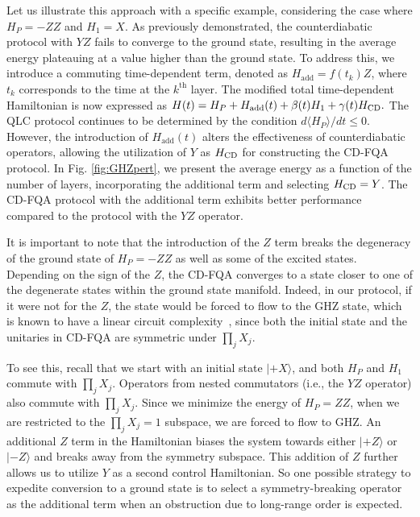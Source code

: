 \documentclass[twocolumn,aps,superscriptaddress,floatfix,longbibliography]{revtex4-2}
\newcommand{\la}{\langle}
\newcommand{\ra}{\rangle}
\def\YZ{\ensuremath{\mathit{YZ}}\xspace}
\def\ZZ{\ensuremath{\mathit{ZZ}}\xspace}
\begin{document}
Let us illustrate this approach with a specific example,
considering the case where $H_P=-\ZZ$ and $H_1=X$. As previously
demonstrated, the counterdiabatic protocol with \YZ fails to
converge to the ground state, resulting in the average energy
plateauing at a value higher than the ground state. To address
this, 
we introduce a commuting time-dependent term,
denoted as $H_{\text{add}}=f(t_{k})Z$, where $t_k$ corresponds
to the time at the $k^{\text{th}}$ layer. The modified total
time-dependent Hamiltonian is now expressed as
$H(t)=H_{P}+H_{\text{add}}(t)+\beta(t)H_1+\gamma(t)H_{\rm CD}.$
The QLC protocol continues to be determined by the condition
$d\la H_P \ra/dt \leq 0$. However, the introduction of
$H_{\text{add}}(t)$ alters the effectiveness of counterdiabatic
operators, allowing the utilization of $Y$ as $H_{\rm CD}$ for
constructing the CD-FQA protocol. In Fig. \ref{fig:GHZpert}, we
present the average energy as a function of the number of
layers, incorporating the additional term and selecting
$H_{\rm CD}=Y$. The CD-FQA protocol with the additional term
exhibits better performance compared to the protocol with the
\YZ operator.

It is important to note that the introduction of the $Z$ term
breaks the degeneracy of the ground state of $H_{P}=-\ZZ$ as well as some of the excited states. 
Depending on the sign of the $Z$, the CD-FQA converges
to a state closer to one of the degenerate states within the
ground state manifold. Indeed, in our protocol, if it were not for the
$Z$, the state would be forced to flow to the GHZ
state, which is known to have a linear circuit
complexity~\cite{bravyi2006lieb, yu2023learning}, since both the initial state and the unitaries in CD-FQA are symmetric under $\prod_j X_j$.  

To see this, recall that we start with an initial state  $|{+}X\rangle$, and both $H_P$ and $H_1$ commute with $\prod_j X_j$. Operators from nested commutators (i.e., the \YZ operator) also commute with $\prod_j X_j$. Since we minimize the energy of $H_P=\ZZ$, when we are restricted to the $\prod_j X_j=1$ subspace, we are forced to flow to GHZ. An additional $Z$ term in the Hamiltonian biases the system towards either $|{+}Z\rangle$ or $|{-}Z\rangle$ and breaks away from the symmetry subspace. This addition of $Z$ further allows us to utilize $Y$ as a second control Hamiltonian. So one possible strategy to expedite conversion to a ground state is to select a
symmetry-breaking operator as the additional term when an obstruction due to long-range order is expected.
\end{document}
